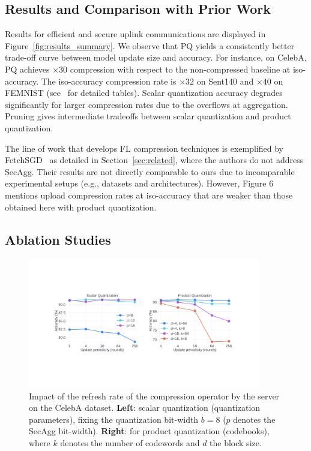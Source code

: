 \documentclass[11pt]{article}
\newcommand{\SecAgg}{{\sc SecAgg}\xspace}
\begin{document}
\subsection{Results and Comparison with Prior Work}

Results for efficient and secure uplink communications are displayed in Figure~\ref{fig:results_summary}.
We observe that PQ yields a consistently better trade-off curve between model update size and accuracy. For instance, on CelebA, PQ achieves $\times 30$ compression with respect to the non-compressed baseline at iso-accuracy. The iso-accuracy compression rate is $\times 32$ on Sent140 and $\times 40$ on FEMNIST (see~\cite{Graham-techreport} for detailed tables).
Scalar quantization accuracy degrades significantly for larger compression rates due to the overflows at aggregation.
Pruning gives intermediate tradeoffs between scalar quantization and product quantization.

The line of work that develops FL compression techniques is exemplified by FetchSGD~\cite{Graham-rothchild2020fetchsgd} as detailed in Section~\ref{sec:related}, where the authors do not address \SecAgg.
Their results are not directly comparable to ours due to incomparable experimental setups (e.g., datasets and architectures).
However, Figure 6~\cite{Graham-techreport} mentions upload compression rates at iso-accuracy that are weaker than those obtained here with product quantization.

\subsection{Ablation Studies}
\label{subsec:ablations}

\begin{figure}[t]
    \label{mask-refresh}
    \centering
    \includegraphics[width=0.9\textwidth]{submissions/GrahamCormode/figs/refresh.pdf}
    \caption{\label{fig:refresh}
    Impact of the refresh rate of the compression operator by the server on the CelebA dataset. \textbf{Left}:  scalar quantization (quantization parameters), fixing the quantization bit-width $b=8$ ($p$ denotes the \SecAgg bit-width). \textbf{Right}: for product quantization (codebooks), where $k$ denotes the number of codewords and $d$ the block size.}
    \vspace{-3mm}
\end{figure}
\end{document}
